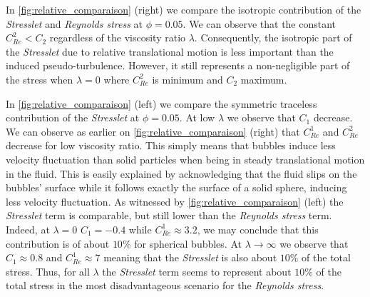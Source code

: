 In \ref{fig:relative_comparaison} (right) we compare the isotropic contribution of the \textit{Stresslet} and \textit{Reynolds stress} at $\phi =0.05$. 
We can observe that the constant $C_{Re}^2 < C_2$ regardless of the viscosity ratio $\lambda$. 
Consequently, the isotropic part of the \textit{Stresslet} due to relative translational motion is less important than the induced pseudo-turbulence.
However, it still represents a non-negligible part of the stress when $\lambda = 0$ where $C_{Re}^2$ is minimum and $C_2$ maximum. 


In \ref{fig:relative_comparaison} (left) we compare the symmetric traceless contribution of the \textit{Stresslet} at $\phi =0.05$. 
At low $\lambda$ we observe that $C_1$ decrease. 
We can observe as earlier on \ref{fig:relative_comparaison} (right) that $C_{Re}^1$ and $C_{Re}^2$ decrease for low viscosity ratio. 
This simply means that bubbles induce less velocity fluctuation than solid particles when being in steady translational motion in the fluid. 
This is easily explained by acknowledging that the fluid slips on the bubbles' surface while it follows exactly the surface of a solid sphere, inducing less velocity fluctuation. 
As witnessed by \ref{fig:relative_comparaison} (left) the \textit{Stresslet} term is comparable, but still lower than the \textit{Reynolds stress} term.
Indeed, at $\lambda = 0$ $C_1 = - 0.4$ while $C^1_{Re} \approx 3.2$, we may conclude that this contribution is of about $10\%$ for spherical bubbles.
At $\lambda \to \infty$ we observe that $C_1 \approx 0.8$ and $C^1_{Re}\approx 7$ meaning that the \textit{Stresslet} is also about $10\%$ of the total stress.
Thus, for all $\lambda$ the \textit{Stresslet} term seems to represent about $10\%$ of the total stress in the most disadvantageous scenario for the \textit{Reynolds stress}. 

